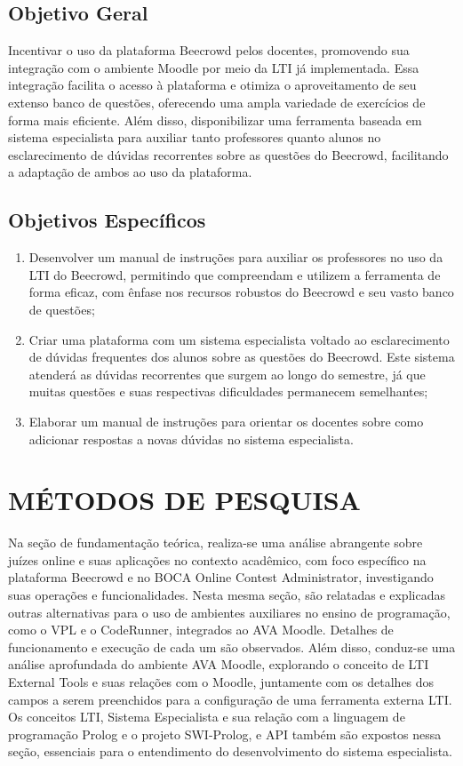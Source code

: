 \subsection{\textbf{Objetivo Geral}}

Incentivar o uso da plataforma Beecrowd pelos docentes, promovendo sua integração com o ambiente Moodle por meio da LTI já implementada. Essa integração facilita o acesso à plataforma e otimiza o aproveitamento de seu extenso banco de questões, oferecendo uma ampla variedade de exercícios de forma mais eficiente. Além disso, disponibilizar uma ferramenta baseada em sistema especialista para auxiliar tanto professores quanto alunos no esclarecimento de dúvidas recorrentes sobre as questões do Beecrowd, facilitando a adaptação de ambos ao uso da plataforma.

\subsection{\textbf{Objetivos Específicos}}

\begin{enumerate}[label=(\alph*)]
    \item  Desenvolver um manual de instruções para auxiliar os professores no uso da LTI do Beecrowd, permitindo que compreendam e utilizem a ferramenta de forma eficaz, com ênfase nos recursos robustos do Beecrowd e seu vasto banco de questões;
    \item  Criar uma plataforma com um sistema especialista voltado ao esclarecimento de dúvidas frequentes dos alunos sobre as questões do Beecrowd. Este sistema atenderá as dúvidas recorrentes que surgem ao longo do semestre, já que muitas questões e suas respectivas dificuldades permanecem semelhantes;
    \item  Elaborar um manual de instruções para orientar os docentes sobre como adicionar respostas a novas dúvidas no sistema especialista.
\end{enumerate}

\section{MÉTODOS DE PESQUISA}

Na seção de fundamentação teórica, realiza-se uma análise abrangente sobre juízes online e suas aplicações no contexto acadêmico, com foco específico na plataforma Beecrowd e no BOCA Online Contest Administrator, investigando suas operações e funcionalidades. Nesta mesma seção, são relatadas e explicadas outras alternativas para o uso de ambientes auxiliares no ensino de programação, como o VPL e o CodeRunner, integrados ao AVA Moodle. Detalhes de funcionamento e execução de cada um são observados. Além disso, conduz-se uma análise aprofundada do ambiente AVA Moodle, explorando o conceito de LTI External Tools e suas relações com o Moodle, juntamente com os detalhes dos campos a serem preenchidos para a configuração de uma ferramenta externa LTI. Os conceitos LTI, Sistema Especialista e sua relação com a linguagem de programação Prolog e o projeto SWI-Prolog, e API também são expostos nessa seção, essenciais para o entendimento do desenvolvimento do sistema especialista. 

